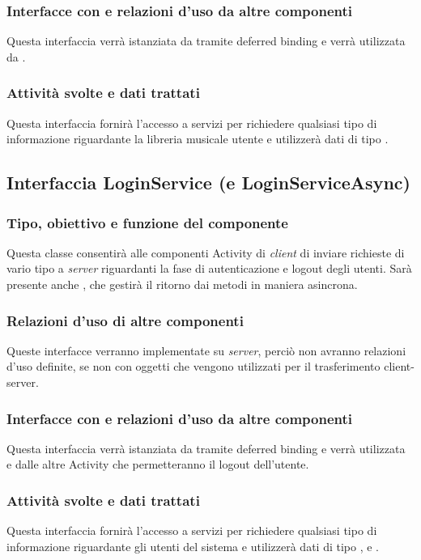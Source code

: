 \subsubsection*{Interfacce con e relazioni d'uso da altre componenti}
Questa interfaccia verr\`a istanziata da  tramite deferred
binding e verr\`a utilizzata da .
\subsubsection*{Attivit\`a svolte e dati trattati}
Questa interfaccia fornir\`a l'accesso a servizi per richiedere qualsiasi tipo
di informazione riguardante la libreria musicale utente e utilizzer\`a dati di
tipo .


\subsection{Interfaccia LoginService (e LoginServiceAsync)}
\subsubsection*{Tipo, obiettivo e funzione del componente}
Questa classe consentir\`a alle componenti Activity di \emph{client} di inviare
richieste di vario tipo a \emph{server} riguardanti la fase di autenticazione e
logout degli utenti. Sar\`a presente anche , che gestir\`a
il ritorno dai metodi in maniera asincrona.

\subsubsection*{Relazioni d'uso di altre componenti}
Queste interfacce verranno implementate su \emph{server}, perci\`o non
avranno relazioni d'uso definite, se non con oggetti  che
vengono utilizzati per il trasferimento client-server.

\subsubsection*{Interfacce con e relazioni d'uso da altre componenti}
Questa interfaccia verr\`a istanziata da  tramite deferred
binding e verr\`a utilizzata \\ e dalle altre Activity che
permetteranno il logout dell'utente.

\subsubsection*{Attivit\`a svolte e dati trattati}
Questa interfaccia fornir\`a l'accesso a servizi per richiedere qualsiasi tipo
di informazione riguardante gli utenti del sistema e utilizzer\`a dati di tipo
,  e .


